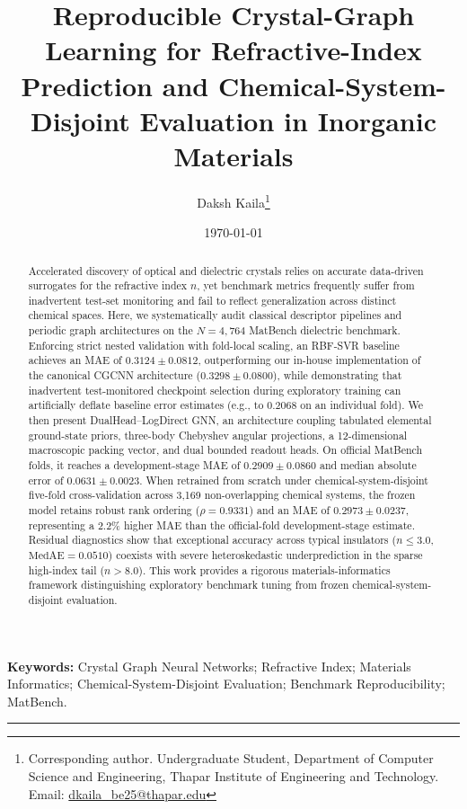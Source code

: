 \documentclass[journal,article,submit,moreauthors,pdftex]{article}
\title{\textbf{Reproducible Crystal-Graph Learning for Refractive-Index Prediction and Chemical-System-Disjoint Evaluation in Inorganic Materials}}
\author{Daksh Kaila\thanks{Corresponding author. Undergraduate Student, Department of Computer Science and Engineering, Thapar Institute of Engineering and Technology. Email: \href{mailto:dkaila_be25@thapar.edu}{dkaila_be25@thapar.edu}}}
\affil{Department of Computer Science and Engineering, Thapar Institute of Engineering and Technology, Patiala, Punjab 147004, India}
\date{\today}
\begin{document}
\maketitle

\begin{abstract}
Accelerated discovery of optical and dielectric crystals relies on accurate data-driven surrogates for the refractive index $n$, yet benchmark metrics frequently suffer from inadvertent test-set monitoring and fail to reflect generalization across distinct chemical spaces. Here, we systematically audit classical descriptor pipelines and periodic graph architectures on the $N = 4{,}764$ MatBench dielectric benchmark. Enforcing strict nested validation with fold-local scaling, an RBF-SVR baseline achieves an MAE of $0.3124 \pm 0.0812$, outperforming our in-house implementation of the canonical CGCNN architecture ($0.3298 \pm 0.0800$), while demonstrating that inadvertent test-monitored checkpoint selection during exploratory training can artificially deflate baseline error estimates (e.g., to $0.2068$ on an individual fold). We then present DualHead--LogDirect GNN, an architecture coupling tabulated elemental ground-state priors, three-body Chebyshev angular projections, a 12-dimensional macroscopic packing vector, and dual bounded readout heads. On official MatBench folds, it reaches a development-stage MAE of $0.2909 \pm 0.0860$ and median absolute error of $0.0631 \pm 0.0023$. When retrained from scratch under chemical-system-disjoint five-fold cross-validation across 3,169 non-overlapping chemical systems, the frozen model retains robust rank ordering ($\rho = 0.9331$) and an MAE of $0.2973 \pm 0.0237$, representing a 2.2\% higher MAE than the official-fold development-stage estimate. Residual diagnostics show that exceptional accuracy across typical insulators ($n \le 3.0$, $\text{MedAE} = 0.0510$) coexists with severe heteroskedastic underprediction in the sparse high-index tail ($n > 8.0$). This work provides a rigorous materials-informatics framework distinguishing exploratory benchmark tuning from frozen chemical-system-disjoint evaluation.
\end{abstract}

\textbf{Keywords:} Crystal Graph Neural Networks; Refractive Index; Materials Informatics; Chemical-System-Disjoint Evaluation; Benchmark Reproducibility; MatBench.

\vspace{1em}
\hrule
\vspace{1em}
\end{document}
